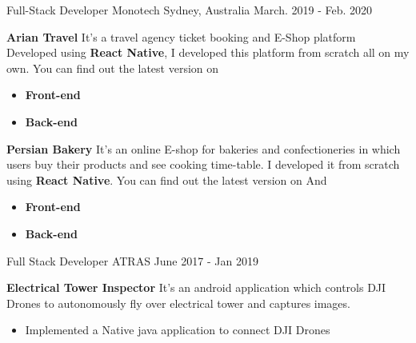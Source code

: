 \begin{cventries}
{        
        \break
    }
  \cventry
    {Full-Stack Developer} %
    {Monotech } %
    {Sydney, Australia} %
    {March. 2019 - Feb. 2020} %
    {
        \textcolor{primary}{\textbf{Arian Travel}}\break
        {It's a travel agency ticket booking and E-Shop platform Developed using \textbf{React Native}, I developed this platform from scratch all on my own. You can find out the latest version on }
        \begin{itemize}
            \item \textbf{Front-end} 
            \item \textbf{Back-end}  
        \end{itemize}
        \textcolor{primary}{\textbf{Persian Bakery}}\break
        {It's an online E-shop for bakeries and confectioneries in which users buy their products and see cooking time-table. I developed it from scratch using \textbf{React Native}. You can find out the latest version on  And }
        \begin{itemize}
            \item \textbf{Front-end} 
            \item \textbf{Back-end}  
        \end{itemize}
    }
  \cventry
    {Full Stack Developer} %
    {ATRAS} %
    {} %
    {June 2017 - Jan 2019} %
    {
        \textcolor{primary}{\textbf{Electrical Tower Inspector}}\break
        {It's an android application which controls DJI Drones to autonomously fly over electrical tower and captures images.}    
        \begin{itemize}
            \item Implemented a Native java application to connect DJI Drones

\end{itemize}}
\end{cventries}
